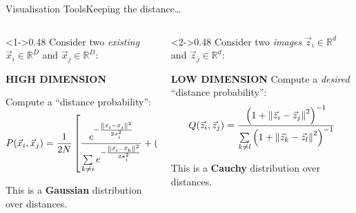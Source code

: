 \begin{frame}{Visualisation Tools}{Keeping the distance\dots}
    \vfill
    \begin{columns}[T]
        \begin{column}<1->{0.48\textwidth}
            Consider two \emph{existing} $\vec{x}_i \in \mathbb{R}^D$ and $\vec{x}_j \in \mathbb{R}^D$:
            \begin{center}
                \large \textbf{HIGH DIMENSION}
            \end{center}
            Compute a \enquote{distance probability}:
            \begin{equation*}
                P(\vec{x}_i, \vec{x}_j)
                =
                \frac{1}{2N}
                \left[
                    \frac{
                        e^{-\frac{\norm{\vec{x}_i - \vec{x}_j}^2}{2 \sigma_i^2}}
                    }{
                        \sum\limits_{k \neq i}
                        e^{-\frac{\norm{\vec{x}_i - \vec{x}_k}^2}{2 \sigma_i^2}}
                    }
                    +
                    (i \leftrightarrow j)
                    \right]
            \end{equation*}

            This is a \textbf{Gaussian} distribution over distances.
        \end{column}
        \hfil
        \begin{column}<2->{0.48\textwidth}
            Consider two \emph{images} $\vec{z}_i \in \mathbb{R}^d$ and $\vec{z}_j \in \mathbb{R}^d$:
            \begin{center}
                \large \textbf{LOW DIMENSION}
                Compute a \emph{desired} \enquote{distance probability}:
                \begin{equation*}
                    Q(\vec{z}_i, \vec{z}_j)
                    =
                    \frac{
                        \left( 1 + \norm{\vec{z}_i - \vec{z}_j}^2 \right)^{-1}
                    }{
                        \sum\limits_{k \neq l}
                        \left( 1 + \norm{\vec{z}_k - \vec{z}_l}^2 \right)^{-1}
                    }
                \end{equation*}

                This is a \textbf{Cauchy} distribution over distances.
            \end{center}
        \end{column}
    \end{columns}
    \vfill
\end{frame}

